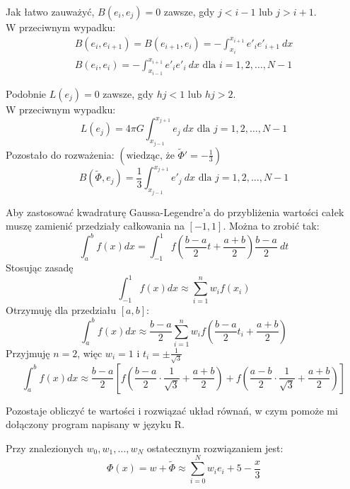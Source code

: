 \documentclass{article}
\begin{document}
\noindent
Jak łatwo zauważyć, \(B(e_i, e_j) = 0\) zawsze, gdy \(j < i-1 \text{ lub } j > i+1\).\\
W przeciwnym wypadku:
\begin{gather*}
    B(e_i, e_{i+1}) = B(e_{i+1}, e_i) = -\int_{x_i}^{x_{i+1}} e'_i e'_{i+1}\ dx\\
    B(e_i, e_i) = -\int_{x_{i-1}}^{x_{i+1}} e'_i e'_i\ dx \text{ dla } i=1,2,\ldots,N-1
\end{gather*}

\noindent
Podobnie \(L(e_j) = 0\) zawsze, gdy \(hj < 1 \text{ lub } hj > 2\).\\
W przeciwnym wypadku:
\[L(e_j) = 4 \pi G \int_{x_{j-1}}^{x_{j+1}} e_j\ dx \text{ dla } j=1,2,\ldots,N-1\]
Pozostało do rozważenia: \(\left(\text{wiedząc, że } \tilde{\Phi}' = -\frac{1}{3}\right)\)
\[B(\tilde{\Phi}, e_j) = \frac{1}{3} \int_{x_{j-1}}^{x_{j+1}} e'_j\ dx \text{ dla } j=1,2,\ldots,N-1\]

Aby zastosować kwadraturę Gaussa-Legendre'a do przybliżenia wartości całek muszę zamienić przedziały całkowania na \([-1,1]\). Można to zrobić tak:
\[\int_a^b f(x)dx = \int_{-1}^1 f\left(\frac{b-a}{2} t + \frac{a+b}{2}\right)\frac{b-a}{2}\ dt\]
Stosując zasadę
\[\int_{-1}^1 f(x)dx \approx \sum_{i=1}^n w_i f(x_i)\]
Otrzymuję dla przedziału \([a,b]\):
\[\int_a^b f(x)dx \approx \frac{b-a}{2} \sum_{i=1}^n w_i f\left(\frac{b-a}{2} t_i + \frac{a + b}{2}\right)\]
Przyjmuję \(n=2\), więc \(w_i = 1 \text{ i } t_i = \pm \frac{1}{\sqrt{3}}\)
\[\int_a^b f(x)dx \approx \frac{b-a}{2} \left[f\left(\frac{b-a}{2} \cdot \frac{1}{\sqrt{3}} + \frac{a+b}{2}\right) + f\left(\frac{a-b}{2} \cdot \frac{1}{\sqrt{3}} + \frac{a+b}{2}\right)\right]\]

\vspace{5mm}
\noindent
Pozostaje obliczyć te wartości i rozwiązać układ równań, w czym pomoże mi dołączony program napisany w języku R.

\vspace{5mm}
\noindent
Przy znalezionych \(w_0, w_1, \ldots, w_N\) ostatecznym rozwiązaniem jest:
\[\Phi(x) = w + \tilde{\Phi} \approx \sum_{i=0}^N w_i e_i + 5 - \frac{x}{3}\]
\end{document}
